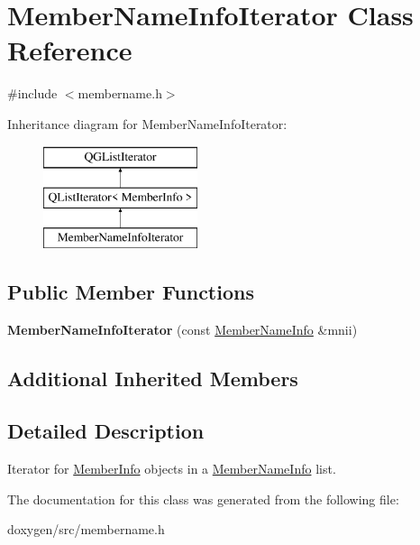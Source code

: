 \hypertarget{class_member_name_info_iterator}{}\section{Member\+Name\+Info\+Iterator Class Reference}
\label{class_member_name_info_iterator}


{\ttfamily \#include $<$membername.\+h$>$}

Inheritance diagram for Member\+Name\+Info\+Iterator\+:\begin{figure}[H]
\begin{center}
\leavevmode
\includegraphics[height=3.000000cm]{class_member_name_info_iterator}
\end{center}
\end{figure}
\subsection*{Public Member Functions}
\begin{DoxyCompactItemize}
\item 
\mbox{\label{class_member_name_info_iterator_a25e0896ffad9e6132b15d42887006205}} 
{\bfseries Member\+Name\+Info\+Iterator} (const \mbox{\hyperlink{class_member_name_info}{Member\+Name\+Info}} \&mnii)
\end{DoxyCompactItemize}
\subsection*{Additional Inherited Members}


\subsection{Detailed Description}
Iterator for \mbox{\hyperlink{struct_member_info}{Member\+Info}} objects in a \mbox{\hyperlink{class_member_name_info}{Member\+Name\+Info}} list. 

The documentation for this class was generated from the following file\+:\begin{DoxyCompactItemize}
\item 
doxygen/src/membername.\+h\end{DoxyCompactItemize}

